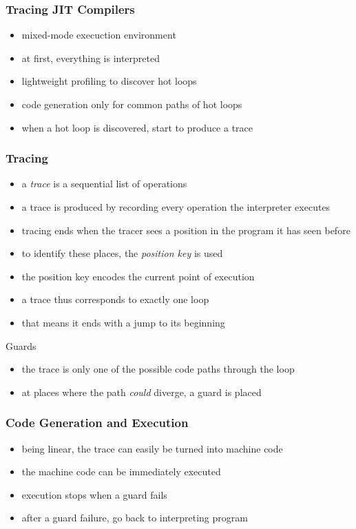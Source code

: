 \documentclass[utf8x]{beamer}
\begin{document}
\begin{frame}
    \frametitle{Tracing JIT Compilers}
    \begin{itemize}
    \item mixed-mode execuction environment
    \item at first, everything is interpreted
    \item lightweight profiling to discover hot loops
    \item code generation only for common paths of hot loops
    \item when a hot loop is discovered, start to produce a trace
    \end{itemize}
\end{frame}

\begin{frame}
    \frametitle{Tracing}
    \begin{itemize}
    \item a \emph{trace} is a sequential list of operations
    \item a trace is produced by recording every operation the interpreter executes
    \item tracing ends when the tracer sees a position in the program it has seen before
    \item to identify these places, the \emph{position key} is used
    \item the position key encodes the current point of execution
    \item a trace thus corresponds to exactly one loop
    \item that means it ends with a jump to its beginning
    \end{itemize}
    \pause
    \begin{block}{Guards}
        \begin{itemize}
        \item the trace is only one of the possible code paths through the loop
        \item at places where the path \emph{could} diverge, a guard is placed
        \end{itemize}
    \end{block}
\end{frame}

\begin{frame}
    \frametitle{Code Generation and Execution}
    \begin{itemize}
    \item being linear, the trace can easily be turned into machine code
    \item the machine code can be immediately executed
    \item execution stops when a guard fails
    \item after a guard failure, go back to interpreting program
    \end{itemize}
\end{frame}
\end{document}
